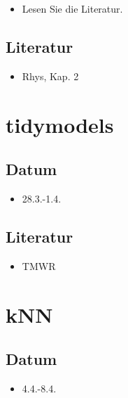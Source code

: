 \documentclass[
]{book}
\providecommand{\tightlist}{%
  \setlength{\itemsep}{0pt}\setlength{\parskip}{0pt}}
\begin{document}
\begin{itemize}
\tightlist
\item
  Lesen Sie die Literatur.
\end{itemize}

\hypertarget{literatur-2}{%
\subsection{Literatur}\label{literatur-2}}

\begin{itemize}
\tightlist
\item
  Rhys, Kap. 2
\end{itemize}

\hypertarget{tidymodels}{%
\section{tidymodels}\label{tidymodels}}

\hypertarget{datum-2}{%
\subsection{Datum}\label{datum-2}}

\begin{itemize}
\tightlist
\item
  28.3.-1.4.
\end{itemize}

\hypertarget{literatur-3}{%
\subsection{Literatur}\label{literatur-3}}

\begin{itemize}
\tightlist
\item
  TMWR
\end{itemize}

\hypertarget{knn}{%
\section{kNN}\label{knn}}

\hypertarget{datum-3}{%
\subsection{Datum}\label{datum-3}}

\begin{itemize}
\tightlist
\item
  4.4.-8.4.
\end{itemize}
\end{document}
